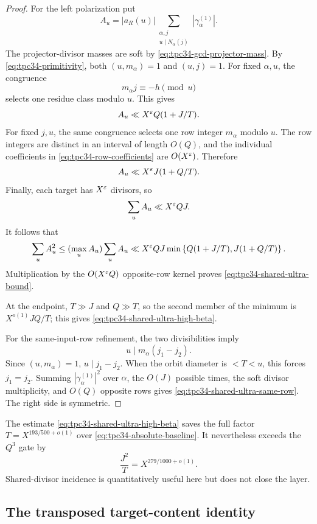 \begin{proof}
For the left polarization put
\[
 A_u=|a_R(u)|
 \sum_{\substack{\alpha,j\\u\mid N_\alpha(j)}}
 |\gamma_\alpha^{(1)}|.
\]
The projector-divisor masses are soft by
\eqref{eq:tpc34-gcd-projector-mass}.  By
\eqref{eq:tpc34-primitivity}, both \((u,m_\alpha)=1\) and \((u,j)=1\).
For fixed \(\alpha,u\), the congruence
\[
 m_\alpha j\equiv-h\pmod u
\]
selects one residue class modulo \(u\).  This gives
\[
 A_u\ll X^\varepsilon Q(1+J/T).
\]
For fixed \(j,u\), the same congruence selects one row integer
\(m_\alpha\) modulo \(u\).  The row integers are distinct in an interval
of length \(O(Q)\), and the individual coefficients in
\eqref{eq:tpc34-row-coefficients} are \(O(X^\varepsilon)\).  Therefore
\[
 A_u\ll X^\varepsilon J(1+Q/T).
\]
Finally, each target has \(X^\varepsilon\) divisors, so
\[
 \sum_uA_u\ll X^\varepsilon QJ.
\]
It follows that
\[
 \sum_uA_u^2
 \le(\max_uA_u)\sum_uA_u
 \ll X^\varepsilon QJ
 \min\left\{
 Q(1+J/T),J(1+Q/T)
 \right\}.
\]
Multiplication by the \(O(X^\varepsilon Q)\) opposite-row kernel proves
\eqref{eq:tpc34-shared-ultra-bound}.

At the endpoint, \(T\gg J\) and \(Q\gg T\), so the second member of the
minimum is \(X^{o(1)}JQ/T\); this gives
\eqref{eq:tpc34-shared-ultra-high-beta}.

For the same-input-row refinement, the two divisibilities imply
\[
 u\mid m_\alpha(j_1-j_2).
\]
Since \((u,m_\alpha)=1\), \(u\mid j_1-j_2\).  When the orbit diameter is
\(<T<u\), this forces \(j_1=j_2\).  Summing
\(|\gamma_\alpha^{(1)}|^2\) over \(\alpha\), the \(O(J)\) possible times,
the soft divisor multiplicity, and \(O(Q)\) opposite rows gives
\eqref{eq:tpc34-shared-ultra-same-row}.  The right side is symmetric.
\end{proof}

\begin{remark}
\label{rem:tpc34-shared-u-not-closure}
The estimate \eqref{eq:tpc34-shared-ultra-high-beta} saves the full factor
\(T=X^{193/500+o(1)}\) over
\eqref{eq:tpc34-absolute-baseline}.  It nevertheless exceeds the
\(Q^3\) gate by
\[
 \frac{J^2}{T}=X^{279/1000+o(1)}.
\]
Shared-divisor incidence is quantitatively useful here but does not close
the layer.
\end{remark}

\subsection{The transposed target-content identity}

